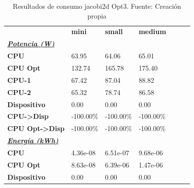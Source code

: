 \begin{table}[H]
    \centering
    \begin{tabular}{lllllll}
    \rowcolor[HTML]{DAE8FC} \ & \textbf{mini} & \textbf{	small} & \textbf{	medium} \\
    \cellcolor[HTML]{DAE8FC} \textbf{\textbf{{\emph{{\underline{{Potencia (W)}}}}}}} &  & 	 & 	 \\
    \rowcolor[HTML]{EFEFEF} \cellcolor[HTML]{DAE8FC} \textbf{CPU} & 63.95 & 	64.06 & 	65.01 \\
    \cellcolor[HTML]{DAE8FC} \textbf{CPU Opt} & 132.74 & 	165.78 & 	175.40 \\
    \rowcolor[HTML]{EFEFEF} \cellcolor[HTML]{DAE8FC} \textbf{\quad CPU-1} & 67.42 & 	87.04 & 	88.82 \\
    \cellcolor[HTML]{DAE8FC} \textbf{\quad CPU-2} & 65.32 & 	78.74 & 	86.58 \\
    \rowcolor[HTML]{EFEFEF} \cellcolor[HTML]{DAE8FC} \textbf{Dispositivo} & 0.00 & 	0.00 & 	0.00 \\
    \cellcolor[HTML]{DAE8FC} \textbf{CPU->Disp} & -100.00\% & 	-100.00\% & 	-100.00\% \\
    \rowcolor[HTML]{EFEFEF} \cellcolor[HTML]{DAE8FC} \textbf{CPU Opt->Disp} & -100.00\% & 	-100.00\% & 	-100.00\% \\
    \cellcolor[HTML]{DAE8FC} \textbf{\textbf{{\emph{{\underline{{Energía (kWh)}}}}}}} &  & 	 & 	 \\
    \rowcolor[HTML]{EFEFEF} \cellcolor[HTML]{DAE8FC} \textbf{CPU} & 4.36e-08 & 	6.51e-07 & 	9.68e-06 \\
    \cellcolor[HTML]{DAE8FC} \textbf{CPU Opt} & 8.63e-08 & 	6.39e-06 & 	1.47e-06 \\
    \rowcolor[HTML]{EFEFEF} \cellcolor[HTML]{DAE8FC} \textbf{Dispositivo} & 0.00 & 	0.00 & 	0.00 \\
    \end{tabular}
    \caption[Resultados de consumo jacobi2d Opt3]{{Resultados de consumo jacobi2d Opt3. Fuente: Creación propia}}
    \label{table_test_jacobi2d_Opt3_hw_powerResults}
\end{table}